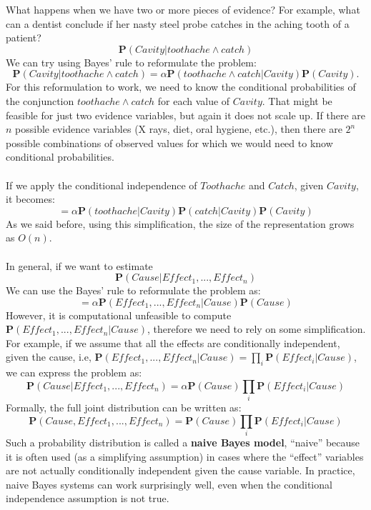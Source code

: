 What happens when we have two or more pieces of evidence? For example, what can a dentist conclude if her nasty steel probe catches in the aching tooth of a patient?
\[\textbf{P}(Cavity |toothache \land catch)\]
We can try using Bayes’ rule to reformulate the problem:
\[\textbf{P}(Cavity |toothache \land catch) = \alpha \textbf{P}(toothache \land catch | Cavity) \textbf{P}(Cavity) . \]
For this reformulation to work, we need to know the conditional probabilities of the conjunction $toothache \land catch$ for each value of $Cavity$. That might be feasible for just two evidence variables, but again it does not scale up. If there are $n$ possible evidence variables (X rays, diet, oral hygiene, etc.), then there are $2^n$ possible combinations of observed values for which we would need to know conditional probabilities.\\\\
If we apply the conditional independence of $Toothache$ and $Catch$, given $Cavity$, it becomes:
\[= \alpha \textbf{P}(toothache|Cavity)\textbf{P}(catch|Cavity)\textbf{P}(Cavity)\]
As we said before, using this simplification, the size of the representation grows as $O(n)$.\\\\
In general, if we want to estimate
\[\textbf{P}(Cause | Effect_1, ..., Effect_n)\]
We can use the Bayes' rule to reformulate the problem as:
\[= \alpha \textbf{P}(Effect_1, ..., Effect_n | Cause) \textbf{P}(Cause)\]
However, it is computational unfeasible to compute $\textbf{P}(Effect_1, ..., Effect_n | Cause)$, therefore we need to rely on some simplification. For example, if we assume that all the effects are conditionally independent, given the cause, i.e, $\textbf{P}(Effect_1, ..., Effect_n | Cause) = \prod_i \textbf{P}(Effect_i| Cause)$, we can express the problem as:
\[\textbf{P}(Cause | Effect_1, ..., Effect_n) = \alpha \textbf{P}(Cause) \prod_i \textbf{P}(Effect_i | Cause) \]
Formally, the full joint distribution can be written as:
\[\textbf{P}(Cause, Effect_1, ..., Effect_n) = \textbf{P}(Cause) \prod_i \textbf{P}(Effect_i | Cause)\]
Such a probability distribution is called a \textbf{naive Bayes model}, “naive” because it is often used (as a simplifying assumption) in cases where the “effect” variables are not actually conditionally independent given the cause variable.  In practice, naive Bayes systems can work surprisingly well, even when the conditional independence assumption is not true.

